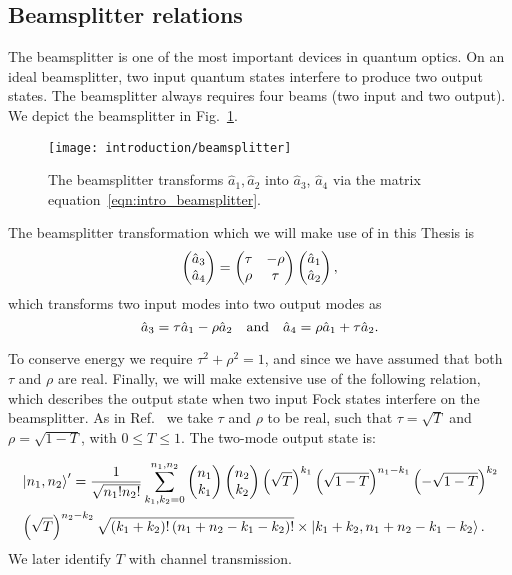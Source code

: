 \FloatBarrier
\subsection{Beamsplitter relations}
The beamsplitter is one of the most important devices in quantum optics. On an ideal beamsplitter, two input quantum states interfere to produce two output states. The beamsplitter always requires four beams (two input and two output). We depict the beamsplitter in Fig.~\ref{fig:intro_beamsplitter}. %


\begin{figure}[htp]
\centering
\captionsetup{width=0.8\linewidth}
\texttt{[image: introduction/beamsplitter]}
\caption{\label{fig:intro_beamsplitter} The beamsplitter transforms $\hat{a}_1, \hat{a}_2$ into $\hat{a}_3$, $\hat{a}_4$ via the matrix equation~\ref{eqn:intro_beamsplitter}.}
\end{figure}


The beamsplitter transformation which we will make use of in this Thesis is
\begin{equation}\label{eqn:intro_beamsplitter}
\pmqty{\hat{a}_3 \\ \hat{a}_4} = \pmqty{\tau & -\rho \\  \rho & \tau} \pmqty{\hat{a}_1 \\ \hat{a}_2},
\end{equation}
which transforms two input modes into two output modes as
\begin{equation}
\hat{a}_3 = \tau \hat{a}_1 - \rho \hat{a}_2 \qq{and} \hat{a}_4 = \rho \hat{a}_1 + \tau \hat{a}_2.
\end{equation}

\noindent To conserve energy we require $\tau^2 + \rho^2 = 1$, and since we have assumed that both $\tau$ and $\rho$ are real. %
Finally, we will make extensive use of the following relation, which describes the output state when two input Fock states interfere on the beamsplitter. As in Ref.~\cite{Leonhardt2010} we take $\tau$ and $\rho$ to be real, such that $\tau = \sqrt{T}$ and $\rho = \sqrt{1-T}$, with $0 \le T \le 1$. The two-mode output state is:

\begin{align}\label{eqn:intro_beamsplitter_fock}
&\ket{n_1, n_2}^\prime  = \frac{1}{\sqrt{n_1! n_2!}} \sum_{k_1, k_2=0}^{n_1, n_2} \pmqty{n_1 \\ k_1} \pmqty{n_2 \\ k_2} \left(\sqrt{T}\right)^{k_1} \left(\sqrt{1-T}\right)^{n_1 - k_1} \left(-\sqrt{1-T}\right)^{k_2} \notag \\
%
&\left(\sqrt{T}\right)^{n_2 - k_2} \sqrt{\left(k_1 + k_2\right)! \left(n_1 + n_2 - k_1 - k_2\right)!} \times \ket{k_1 + k_2, n_1 + n_2 - k_1 - k_2}.
\end{align}
We later identify $T$ with channel transmission.




